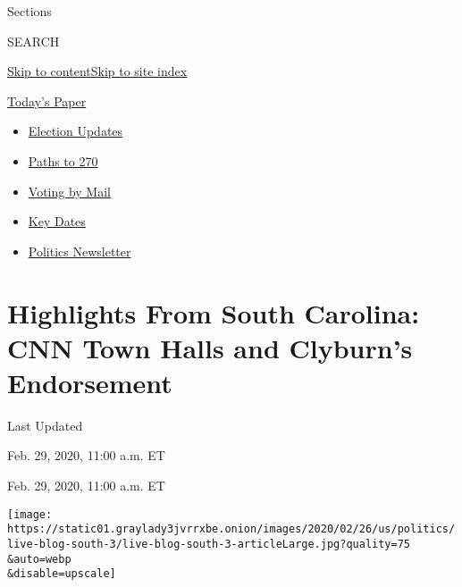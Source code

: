 Sections

SEARCH

\protect\hyperlink{site-content}{Skip to
content}\protect\hyperlink{site-index}{Skip to site index}

\href{https://myaccount.nytimes3xbfgragh.onion/auth/login?response_type=cookie\&client_id=vi}{}

\href{https://www.nytimes3xbfgragh.onion/section/todayspaper}{Today's
Paper}

\begin{itemize}
\item
  \href{https://www.nytimes3xbfgragh.onion/live/2020/09/08/us/trump-vs-biden?action=click\&pgtype=Article\&state=default\&region=TOP_BANNER\&context=storylines_menu}{Election
  Updates}
\item
  \href{https://www.nytimes3xbfgragh.onion/interactive/2020/us/elections/election-states-biden-trump.html?action=click\&pgtype=Article\&state=default\&region=TOP_BANNER\&context=storylines_menu}{Paths
  to 270}
\item
  \href{https://www.nytimes3xbfgragh.onion/interactive/2020/08/31/us/politics/vote-by-mail-deadlines.html?action=click\&pgtype=Article\&state=default\&region=TOP_BANNER\&context=storylines_menu}{Voting
  by Mail}
\item
  \href{https://www.nytimes3xbfgragh.onion/interactive/2019/us/elections/2020-presidential-election-calendar.html?action=click\&pgtype=Article\&state=default\&region=TOP_BANNER\&context=storylines_menu}{Key
  Dates}
\item
  \href{https://www.nytimes3xbfgragh.onion/newsletters/politics?action=click\&pgtype=Article\&state=default\&region=TOP_BANNER\&context=storylines_menu}{Politics
  Newsletter}
\end{itemize}

\hypertarget{highlights-from-south-carolina-cnn-town-halls-and-clyburns-endorsement}{%
\section{Highlights From South Carolina: CNN Town Halls and Clyburn's
Endorsement}\label{highlights-from-south-carolina-cnn-town-halls-and-clyburns-endorsement}}

Last Updated

Feb. 29, 2020, 11:00 a.m. ET

Feb. 29, 2020, 11:00 a.m. ET

\texttt{[image: https://static01.graylady3jvrrxbe.onion/images/2020/02/26/us/politics/live-blog-south-3/live-blog-south-3-articleLarge.jpg?quality=75\\\&auto=webp\\\&disable=upscale]}

